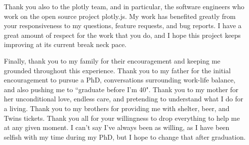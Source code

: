 Thank you also to the plotly team, and in particular, the software engineers who work on the open source project plotly.js. My work has benefited greatly from your responsiveness to my questions, feature requests, and bug reports. I have a great amount of respect for the work that you do, and I hope this project keeps improving at its current break neck pace.

Finally, thank you to my family for their encouragement and keeping me grounded throughout this experience. Thank you to my father for the initial encouragement to pursue a PhD, conversations surrounding work-life balance, and also pushing me to ``graduate before I'm 40". Thank you to my mother for her unconditional love, endless care, and pretending to understand what I do for a living. Thank you to my brothers for providing me with shelter, beer, and Twins tickets. Thank you all for your willingness to drop everything to help me at any given moment. I can't say I've always been as willing, as I have been selfish with my time during my PhD, but I hope to change that after graduation.

